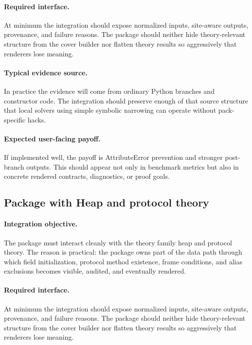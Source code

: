 \documentclass[11pt]{report}
\DeclareRobustCommand{\py}[1]{\texttt{\detokenize{#1}}}
\theoremstyle{definition}
\theoremstyle{plain}
\begin{document}
\paragraph{Required interface.}
At minimum the integration should expose normalized inputs, site-aware
outputs, provenance, and failure reasons. The package should neither hide
theory-relevant structure from the cover builder nor flatten theory
results so aggressively that renderers lose meaning.

\paragraph{Typical evidence source.}
In practice the evidence will come from ordinary Python branches and constructor code. The integration should
preserve enough of that source structure that local solvers using simple symbolic narrowing
can operate without pack-specific hacks.

\paragraph{Expected user-facing payoff.}
If implemented well, the payoff is AttributeError prevention and stronger post-branch outputs. This should appear not only
in benchmark metrics but also in concrete rendered contracts,
diagnostics, or proof goals.


\subsection{Package \py{src/deppy/core} with Heap and protocol theory}

\paragraph{Integration objective.}
The package \py{src/deppy/core} must interact cleanly with the
theory family heap and protocol theory. The reason is practical: the
package owns part of the data path through which field initialization, protocol method existence, frame conditions, and alias exclusions becomes
visible, audited, and eventually rendered.

\paragraph{Required interface.}
At minimum the integration should expose normalized inputs, site-aware
outputs, provenance, and failure reasons. The package should neither hide
theory-relevant structure from the cover builder nor flatten theory
results so aggressively that renderers lose meaning.
\end{document}
